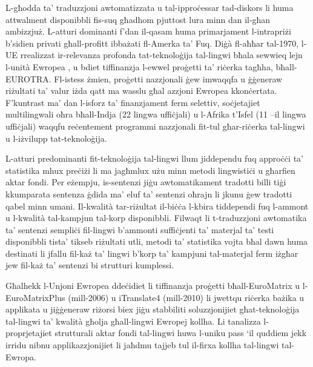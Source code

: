 \documentclass[]{../../metanetpaper}
\begin{document}
\begin{multicols}{2}
L-għodda ta’ traduzzjoni awtomatizzata u tal-ipproċessar tad-diskors li huma attwalment disponibbli fis-suq għadhom pjuttost lura minn dan il-għan ambizzjuż. L-atturi dominanti f’dan il-qasam huma primarjament l-intrapriżi b’sidien privati għall-profitt ibbażati fl-Amerka ta’ Fuq. Diġà fl-aħħar tal-1970, l-UE rrealizzat ir-relevanza profonda tat-teknoloġija tal-lingwi bħala sewwieq lejn l-unità Ewropea , u bdiet tiffinanzja l-ewwel proġetti ta’ riċerka tagħha, bħall-EUROTRA. Fl-istess żmien, proġetti nazzjonali ġew imwaqqfa u ġġeneraw riżultati ta’ valur iżda qatt ma wasslu għal azzjoni Ewropea kkonċertata. F’kuntrast ma’ dan l-isforz ta’ finanzjament ferm selettiv, soċjetajiet multilingwali oħra bħall-Indja (22 lingwa uffiċjali) u l-Afrika t’Isfel (11 –il lingwa uffiċjali) waqqfu reċentement programmi nazzjonali fit-tul għar-riċerka tal-lingwi u l-iżvilupp tat-teknoloġija.
   
L-atturi predominanti fit-teknoloġija tal-lingwi llum jiddependu fuq  approċċi ta’ statistika mhux preċiżi li ma jagħmlux użu minn metodi lingwistiċi u għarfien aktar fondi. Per eżempju, is-sentenzi jiġu awtomatikament tradotti billi tiġi kkumparata sentenza ġdida ma’ eluf ta’ sentenzi oħrajn li jkunu ġew tradotti qabel minn umani. Il-kwalità tar-riżultat il-biċċa l-kbira tiddependi fuq l-ammont u l-kwalità tal-kampjun tal-korp disponibbli. Filwaqt li t-traduzzjoni awtomatika ta’ sentenzi sempliċi fil-lingwi b’ammonti suffiċjenti ta’ materjal ta’ testi disponibbli tista’ tikseb riżultati utli, metodi ta’ statistika vojta bħal dawn huma destinati li jfallu fil-każ ta’ lingwi b’korp ta’ kampjuni tal-materjal ferm iżgħar jew fil-każ ta’ sentenzi bi strutturi kumplessi. 
   
 
Għalhekk l-Unjoni Ewropea ddeċidiet li tiffinanzja proġetti bħall-EuroMatrix u l-EuroMatrixPlus (mill-2006) u iTranslate4 (mill-2010) li jwettqu riċerka bażika u applikata u jiġġeneraw riżorsi biex jiġu stabbiliti soluzzjonijiet għat-teknoloġija tal-lingwi ta’ kwalità għolja għall-lingwi Ewropej kollha. Li tanalizza l-proprjetajiet strutturali aktar fondi tal-lingwi huwa l-uniku pass ‘il quddiem jekk irridu nibnu applikazzjonijiet li jaħdmu tajjeb tul il-firxa kollha tal-lingwi tal-Ewropa.
   

\end{multicols}
\end{document}
